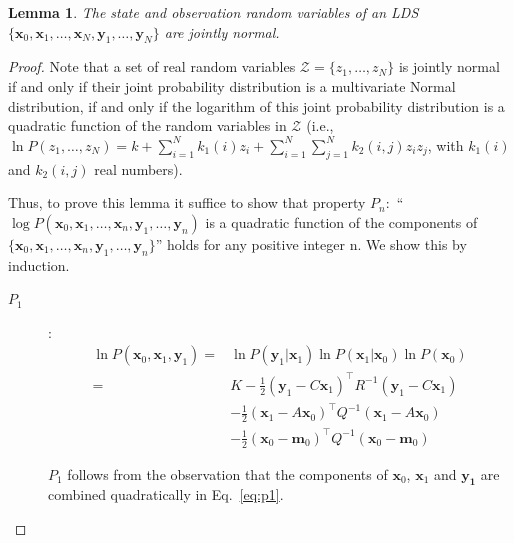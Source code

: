 \documentclass[12pt]{article}
\newtheorem{lemma}{Lemma}
\begin{document}
\begin{lemma}
    The state and observation random variables of an LDS $\{\mathbf{x}_0,
    \mathbf{x}_1, \ldots, \mathbf{x}_N, \mathbf{y}_1, \ldots, \mathbf{y}_N\}$
    are jointly normal.
\end{lemma}

\begin{proof}

    Note that a set of real random variables $\mathcal{Z}=\{z_1,\ldots,z_N\}$ is
    jointly normal if and only if their joint probability distribution is a
    multivariate Normal distribution, if and only if the logarithm of this
    joint probability distribution is a quadratic function of the random
    variables in $\mathcal{Z}$ (i.e., $\ln P(z_1,\ldots,z_N)=k+\sum_{i=1}^N
    k_1(i)z_i+\sum_{i=1}^N\sum_{j=1}^Nk_2(i,j)z_iz_j$, with $k_1(i)$ and
    $k_2(i,j)$ real numbers).

    Thus, to prove this lemma it suffice to show that property $P_n$:\ ``$\log
    P(\mathbf{x}_0, \mathbf{x}_1, \ldots, \mathbf{x}_n, \mathbf{y}_1, \ldots,
    \mathbf{y}_n)$  is a quadratic function of the components of
    $\{\mathbf{x}_0, \mathbf{x}_1, \ldots, \mathbf{x}_n, \mathbf{y}_1, \ldots,
    \mathbf{y}_n\}$'' holds for any positive integer n. We show this by
    induction.

    \begin{description}
        \item[$P_1$]:
            \begin{align}
                \ln P(\mathbf{x}_0, \mathbf{x}_1, \mathbf{y}_1)=&\ln P(\mathbf{y}_1|\mathbf{x}_1)\ln P(\mathbf{x}_1|\mathbf{x}_0)\ln P(\mathbf{x}_0)\nonumber\\
                                                               =&K-\frac{1}{2}(\mathbf{y}_1-C\mathbf{x}_1)^\intercal R^{-1}(\mathbf{y}_1-C\mathbf{x}_1)\nonumber\\
                                                                &-\frac{1}{2}(\mathbf{x}_1-A\mathbf{x}_0)^\intercal Q^{-1}(\mathbf{x}_1-A\mathbf{x}_0)\nonumber\\
                                                                &-\frac{1}{2}(\mathbf{x}_0-\mathbf{m}_0)^\intercal Q^{-1}(\mathbf{x}_0-\mathbf{m}_0)\label{eq:p1}
            \end{align}

            $P_1$ follows from the observation that the components of
            $\mathbf{x}_0$, $\mathbf{x}_1$ and $\mathbf{y_1}$ are combined
            quadratically in Eq.~\ref{eq:p1}.


\end{description}
\end{proof}
\end{document}
